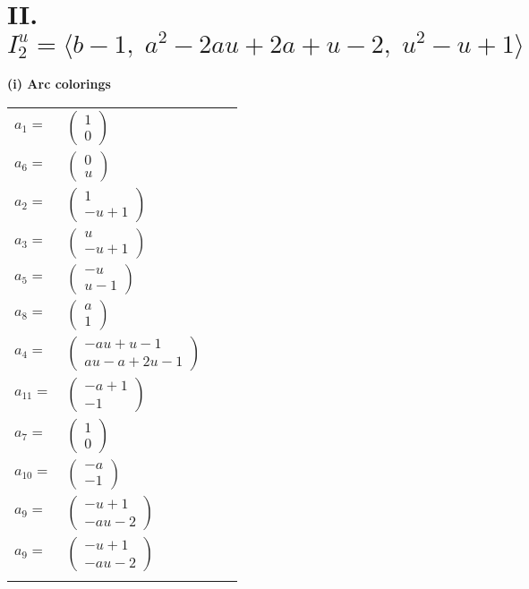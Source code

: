 \documentclass[1p]{elsarticle_modified}
\theoremstyle{definition}
\begin{document}
\centering \section*{II. $I^u_{2}= \langle b-1,\;a^2-2 a u+2 a+u-2,\;u^2- u+1 \rangle$}
\flushleft \textbf{(i) Arc colorings}\\
\begin{tabular}{m{7pt} m{180pt} m{7pt} m{180pt} }
\flushright $a_{1}=$&$\begin{pmatrix}1\\0\end{pmatrix}$ \\
\flushright $a_{6}=$&$\begin{pmatrix}0\\u\end{pmatrix}$ \\
\flushright $a_{2}=$&$\begin{pmatrix}1\\- u+1\end{pmatrix}$ \\
\flushright $a_{3}=$&$\begin{pmatrix}u\\- u+1\end{pmatrix}$ \\
\flushright $a_{5}=$&$\begin{pmatrix}- u\\u-1\end{pmatrix}$ \\
\flushright $a_{8}=$&$\begin{pmatrix}a\\1\end{pmatrix}$ \\
\flushright $a_{4}=$&$\begin{pmatrix}- a u+u-1\\a u- a+2 u-1\end{pmatrix}$ \\
\flushright $a_{11}=$&$\begin{pmatrix}- a+1\\-1\end{pmatrix}$ \\
\flushright $a_{7}=$&$\begin{pmatrix}1\\0\end{pmatrix}$ \\
\flushright $a_{10}=$&$\begin{pmatrix}- a\\-1\end{pmatrix}$ \\
\flushright $a_{9}=$&$\begin{pmatrix}- u+1\\- a u-2\end{pmatrix}$\\ \flushright $a_{9}=$&$\begin{pmatrix}- u+1\\- a u-2\end{pmatrix}$\\&\end{tabular}
\end{document}
